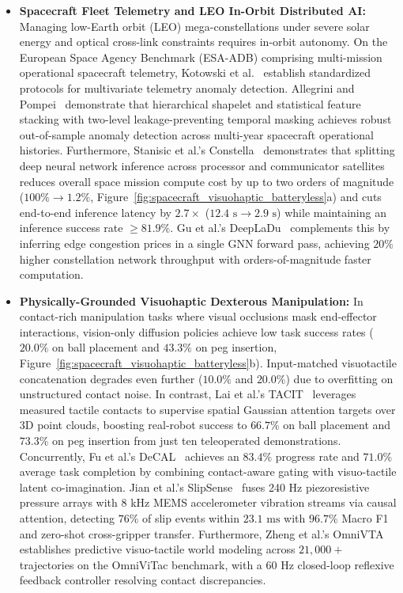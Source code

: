 \begin{itemize}
    \item \textbf{Spacecraft Fleet Telemetry and LEO In-Orbit Distributed AI:} Managing low-Earth orbit (LEO) mega-constellations under severe solar energy and optical cross-link constraints requires in-orbit autonomy. On the European Space Agency Benchmark (ESA-ADB) comprising multi-mission operational spacecraft telemetry, Kotowski et al.~\cite{Kotowski2024ESABenchmark} establish standardized protocols for multivariate telemetry anomaly detection. Allegrini and Pompei~\cite{Allegrini2026ESAPipeline} demonstrate that hierarchical shapelet and statistical feature stacking with two-level leakage-preventing temporal masking achieves robust out-of-sample anomaly detection across multi-year spacecraft operational histories. Furthermore, Stanisic et al.'s Constella~\cite{Stanisic2026SpaceAI} demonstrates that splitting deep neural network inference across processor and communicator satellites reduces overall space mission compute cost by up to two orders of magnitude ($100\% \to 1.2\%$, Figure~\ref{fig:spacecraft_visuohaptic_batteryless}a) and cuts end-to-end inference latency by $2.7\times$ ($12.4\text{ s} \to 2.9\text{ s}$) while maintaining an inference success rate $\ge 81.9\%$. Gu et al.'s DeepLaDu~\cite{Gu2026LEOConstellation} complements this by inferring edge congestion prices in a single GNN forward pass, achieving $20\%$ higher constellation network throughput with orders-of-magnitude faster computation.

    \item \textbf{Physically-Grounded Visuohaptic Dexterous Manipulation:} In contact-rich manipulation tasks where visual occlusions mask end-effector interactions, vision-only diffusion policies achieve low task success rates ($20.0\%$ on ball placement and $43.3\%$ on peg insertion, Figure~\ref{fig:spacecraft_visuohaptic_batteryless}b). Input-matched visuotactile concatenation degrades even further ($10.0\%$ and $20.0\%$) due to overfitting on unstructured contact noise. In contrast, Lai et al.'s TACIT~\cite{Lai2026TACIT} leverages measured tactile contacts to supervise spatial Gaussian attention targets over 3D point clouds, boosting real-robot success to $66.7\%$ on ball placement and $73.3\%$ on peg insertion from just ten teleoperated demonstrations. Concurrently, Fu et al.'s DeCAL~\cite{Fu2026DeCAL} achieves an $83.4\%$ progress rate and $71.0\%$ average task completion by combining contact-aware gating with visuo-tactile latent co-imagination. Jian et al.'s SlipSense~\cite{Jian2026SlipSense} fuses 240 Hz piezoresistive pressure arrays with 8 kHz MEMS accelerometer vibration streams via causal attention, detecting $76\%$ of slip events within $23.1\text{ ms}$ with $96.7\%$ Macro F1 and zero-shot cross-gripper transfer. Furthermore, Zheng et al.'s OmniVTA~\cite{Zheng2026OmniVTA} establishes predictive visuo-tactile world modeling across $21{,}000+$ trajectories on the OmniViTac benchmark, with a 60 Hz closed-loop reflexive feedback controller resolving contact discrepancies.


\end{itemize}
